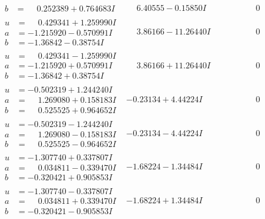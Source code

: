 \documentclass[1p]{elsarticle_modified}
\theoremstyle{definition}
\begin{document}
$$\begin{array}{c|c|c}
\begin{aligned}
b &= \phantom{-}0.252389 + 0.764683 I\end{aligned}
 & \phantom{-}6.40555 - 0.15850 I & \phantom{-0.000000 } 0 \\ \hline\begin{aligned}
u &= \phantom{-}0.429341 + 1.259990 I \\
a &= -1.215920 - 0.570991 I \\
b &= -1.36842 - 0.38754 I\end{aligned}
 & \phantom{-}3.86166 - 11.26440 I & \phantom{-0.000000 } 0 \\ \hline\begin{aligned}
u &= \phantom{-}0.429341 - 1.259990 I \\
a &= -1.215920 + 0.570991 I \\
b &= -1.36842 + 0.38754 I\end{aligned}
 & \phantom{-}3.86166 + 11.26440 I & \phantom{-0.000000 } 0 \\ \hline\begin{aligned}
u &= -0.502319 + 1.244240 I \\
a &= \phantom{-}1.269080 + 0.158183 I \\
b &= \phantom{-}0.525525 + 0.964652 I\end{aligned}
 & -0.23134 + 4.44224 I & \phantom{-0.000000 } 0 \\ \hline\begin{aligned}
u &= -0.502319 - 1.244240 I \\
a &= \phantom{-}1.269080 - 0.158183 I \\
b &= \phantom{-}0.525525 - 0.964652 I\end{aligned}
 & -0.23134 - 4.44224 I & \phantom{-0.000000 } 0 \\ \hline\begin{aligned}
u &= -1.307740 + 0.337807 I \\
a &= \phantom{-}0.034811 - 0.339470 I \\
b &= -0.320421 + 0.905853 I\end{aligned}
 & -1.68224 - 1.34484 I & \phantom{-0.000000 } 0 \\ \hline\begin{aligned}
u &= -1.307740 - 0.337807 I \\
a &= \phantom{-}0.034811 + 0.339470 I \\
b &= -0.320421 - 0.905853 I\end{aligned}
 & -1.68224 + 1.34484 I & \phantom{-0.000000 } 0 \\ \hline\begin{aligned}

\end{aligned}
\end{array}$$
\end{document}
